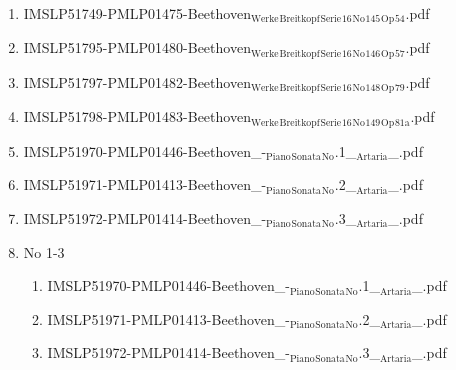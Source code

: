 \documentclass[11pt]{article}
\begin{document}
\begin{enumerate}
\begin{enumerate}
\begin{enumerate}
\item IMSLP51749-PMLP01475-Beethoven$_{\text{Werke}}$$_{\text{Breitkopf}}$$_{\text{Serie}}$$_{\text{16}}$$_{\text{No}}$$_{\text{145}}$$_{\text{Op}}$$_{\text{54}}$.pdf
\label{sec-1-1-1-1-44-9-6-8-44}

\item IMSLP51795-PMLP01480-Beethoven$_{\text{Werke}}$$_{\text{Breitkopf}}$$_{\text{Serie}}$$_{\text{16}}$$_{\text{No}}$$_{\text{146}}$$_{\text{Op}}$$_{\text{57}}$.pdf
\label{sec-1-1-1-1-44-9-6-8-45}

\item IMSLP51797-PMLP01482-Beethoven$_{\text{Werke}}$$_{\text{Breitkopf}}$$_{\text{Serie}}$$_{\text{16}}$$_{\text{No}}$$_{\text{148}}$$_{\text{Op}}$$_{\text{79}}$.pdf
\label{sec-1-1-1-1-44-9-6-8-46}

\item IMSLP51798-PMLP01483-Beethoven$_{\text{Werke}}$$_{\text{Breitkopf}}$$_{\text{Serie}}$$_{\text{16}}$$_{\text{No}}$$_{\text{149}}$$_{\text{Op}}$$_{\text{81a}}$.pdf
\label{sec-1-1-1-1-44-9-6-8-47}

\item IMSLP51970-PMLP01446-Beethoven\_-$_{\text{Piano}}$$_{\text{Sonata}}$$_{\text{No}}$.1\_$_{\text{Artaria}}$\_.pdf
\label{sec-1-1-1-1-44-9-6-8-48}

\item IMSLP51971-PMLP01413-Beethoven\_-$_{\text{Piano}}$$_{\text{Sonata}}$$_{\text{No}}$.2\_$_{\text{Artaria}}$\_.pdf
\label{sec-1-1-1-1-44-9-6-8-49}

\item IMSLP51972-PMLP01414-Beethoven\_-$_{\text{Piano}}$$_{\text{Sonata}}$$_{\text{No}}$.3\_$_{\text{Artaria}}$\_.pdf
\label{sec-1-1-1-1-44-9-6-8-50}

\item No 1-3
\label{sec-1-1-1-1-44-9-6-8-51}
\begin{enumerate}
\item IMSLP51970-PMLP01446-Beethoven\_-$_{\text{Piano}}$$_{\text{Sonata}}$$_{\text{No}}$.1\_$_{\text{Artaria}}$\_.pdf
\label{sec-1-1-1-1-44-9-6-8-51-1}

\item IMSLP51971-PMLP01413-Beethoven\_-$_{\text{Piano}}$$_{\text{Sonata}}$$_{\text{No}}$.2\_$_{\text{Artaria}}$\_.pdf
\label{sec-1-1-1-1-44-9-6-8-51-2}

\item IMSLP51972-PMLP01414-Beethoven\_-$_{\text{Piano}}$$_{\text{Sonata}}$$_{\text{No}}$.3\_$_{\text{Artaria}}$\_.pdf
\label{sec-1-1-1-1-44-9-6-8-51-3}
\end{enumerate}


\end{enumerate}
\end{enumerate}
\end{enumerate}
\end{document}
